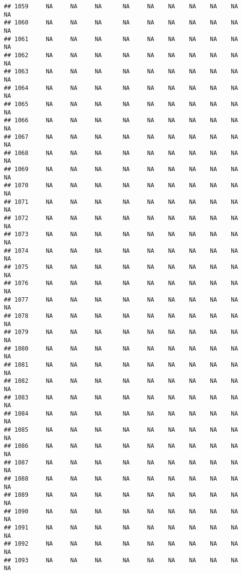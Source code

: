 \documentclass{article}\usepackage{graphicx, color}
\makeatletter
\newenvironment{kframe}{%
 \def\at@end@of@kframe{}%
 \ifinner\ifhmode%
  \def\at@end@of@kframe{\end{minipage}}%
  \begin{minipage}{\columnwidth}%
 \fi\fi%
 \def\FrameCommand##1{\hskip\@totalleftmargin \hskip-\fboxsep
 \colorbox{shadecolor}{##1}\hskip-\fboxsep
     \hskip-\linewidth \hskip-\@totalleftmargin \hskip\columnwidth}%
 \MakeFramed {\advance\hsize-\width
   \@totalleftmargin\z@ \linewidth\hsize
   \@setminipage}}%
 {\par\unskip\endMakeFramed%
 \at@end@of@kframe}
\newenvironment{knitrout}{}{} %
\makeatother
\begin{document}
\begin{knitrout}
\begin{kframe}
\begin{verbatim}
## 1059     NA     NA     NA      NA     NA    NA    NA    NA    NA     NA
## 1060     NA     NA     NA      NA     NA    NA    NA    NA    NA     NA
## 1061     NA     NA     NA      NA     NA    NA    NA    NA    NA     NA
## 1062     NA     NA     NA      NA     NA    NA    NA    NA    NA     NA
## 1063     NA     NA     NA      NA     NA    NA    NA    NA    NA     NA
## 1064     NA     NA     NA      NA     NA    NA    NA    NA    NA     NA
## 1065     NA     NA     NA      NA     NA    NA    NA    NA    NA     NA
## 1066     NA     NA     NA      NA     NA    NA    NA    NA    NA     NA
## 1067     NA     NA     NA      NA     NA    NA    NA    NA    NA     NA
## 1068     NA     NA     NA      NA     NA    NA    NA    NA    NA     NA
## 1069     NA     NA     NA      NA     NA    NA    NA    NA    NA     NA
## 1070     NA     NA     NA      NA     NA    NA    NA    NA    NA     NA
## 1071     NA     NA     NA      NA     NA    NA    NA    NA    NA     NA
## 1072     NA     NA     NA      NA     NA    NA    NA    NA    NA     NA
## 1073     NA     NA     NA      NA     NA    NA    NA    NA    NA     NA
## 1074     NA     NA     NA      NA     NA    NA    NA    NA    NA     NA
## 1075     NA     NA     NA      NA     NA    NA    NA    NA    NA     NA
## 1076     NA     NA     NA      NA     NA    NA    NA    NA    NA     NA
## 1077     NA     NA     NA      NA     NA    NA    NA    NA    NA     NA
## 1078     NA     NA     NA      NA     NA    NA    NA    NA    NA     NA
## 1079     NA     NA     NA      NA     NA    NA    NA    NA    NA     NA
## 1080     NA     NA     NA      NA     NA    NA    NA    NA    NA     NA
## 1081     NA     NA     NA      NA     NA    NA    NA    NA    NA     NA
## 1082     NA     NA     NA      NA     NA    NA    NA    NA    NA     NA
## 1083     NA     NA     NA      NA     NA    NA    NA    NA    NA     NA
## 1084     NA     NA     NA      NA     NA    NA    NA    NA    NA     NA
## 1085     NA     NA     NA      NA     NA    NA    NA    NA    NA     NA
## 1086     NA     NA     NA      NA     NA    NA    NA    NA    NA     NA
## 1087     NA     NA     NA      NA     NA    NA    NA    NA    NA     NA
## 1088     NA     NA     NA      NA     NA    NA    NA    NA    NA     NA
## 1089     NA     NA     NA      NA     NA    NA    NA    NA    NA     NA
## 1090     NA     NA     NA      NA     NA    NA    NA    NA    NA     NA
## 1091     NA     NA     NA      NA     NA    NA    NA    NA    NA     NA
## 1092     NA     NA     NA      NA     NA    NA    NA    NA    NA     NA
## 1093     NA     NA     NA      NA     NA    NA    NA    NA    NA     NA

\end{verbatim}
\end{kframe}
\end{knitrout}
\end{document}
